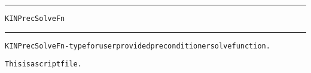 \begin{samepage}
\hrule
\begin{center}
{\large \verb!KINPrecSolveFn!}
\label{p:KINPrecSolveFn}
\end{center}
\hrule\vspace{0.1in}



\begin{alltt}
KINPrecSolveFn - type for user provided preconditioner solve function.
\end{alltt}

\end{samepage}



\begin{samepage}


\begin{alltt}
This is a script file. 
\end{alltt}

\end{samepage}



